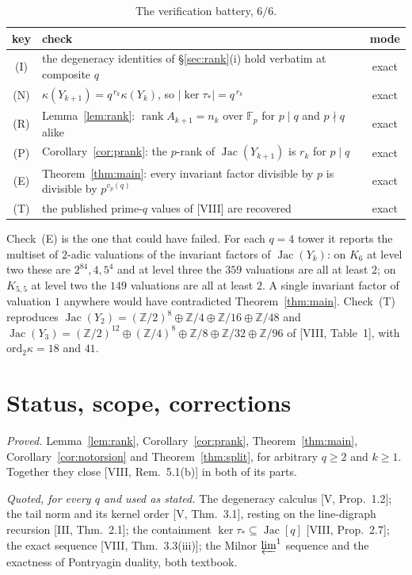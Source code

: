 \documentclass[11pt]{amsart}
\numberwithin{equation}{section}
\theoremstyle{definition}
\theoremstyle{remark}
\newcommand{\Z}{\mathbb{Z}}
\newcommand{\F}{\mathbb{F}}
\newcommand{\Jac}{\operatorname{Jac}}
\newcommand{\rank}{\operatorname{rank}}
\newcommand{\ta}{\tau_*}
\begin{document}
\begin{table}[ht]
\centering\small
\begin{tabular}{clc}
\toprule
key & check & mode\\
\midrule
(I) & the degeneracy identities of \S\ref{sec:rank}(i) hold verbatim at composite $q$ & exact\\
(N) & $\kappa(Y_{k+1})=q^{\,r_k}\kappa(Y_k)$, so $|\ker\ta|=q^{\,r_k}$ & exact\\
(R) & Lemma~\ref{lem:rank}: $\rank A_{k+1}=n_k$ over $\F_p$ for $p\mid q$ and $p\nmid q$ alike & exact\\
(P) & Corollary~\ref{cor:prank}: the $p$-rank of $\Jac(Y_{k+1})$ is $r_k$ for $p\mid q$ & exact\\
(E) & Theorem~\ref{thm:main}: every invariant factor divisible by $p$ is divisible by $p^{v_p(q)}$ & exact\\
(T) & the published prime-$q$ values of [VIII] are recovered & exact\\
\bottomrule
\end{tabular}
\caption{The verification battery, $6/6$.}
\label{tab:battery}
\end{table}

Check~(E) is the one that could have failed. For each $q=4$ tower it reports the
multiset of $2$-adic valuations of the invariant factors of $\Jac(Y_k)$: on $K_6$ at
level two these are $2^{84},4,5^4$ and at level three the $359$ valuations are all at
least $2$; on $K_{5,5}$ at level two the $149$ valuations are all at least $2$. A single
invariant factor of valuation $1$ anywhere would have contradicted
Theorem~\ref{thm:main}. Check~(T) reproduces
$\Jac(Y_2)=(\Z/2)^8\oplus\Z/4\oplus\Z/16\oplus\Z/48$ and
$\Jac(Y_3)=(\Z/2)^{12}\oplus(\Z/4)^8\oplus\Z/8\oplus\Z/32\oplus\Z/96$ of [VIII, Table~1],
with $\mathrm{ord}_2\kappa=18$ and $41$.

\section{Status, scope, corrections}\label{sec:scope}

\emph{Proved.} Lemma~\ref{lem:rank}, Corollary~\ref{cor:prank}, Theorem~\ref{thm:main},
Corollary~\ref{cor:notorsion} and Theorem~\ref{thm:split}, for arbitrary $q\ge2$ and
$k\ge1$. Together they close [VIII, Rem.~5.1(b)] in both of its parts.

\emph{Quoted, for every $q$ and used as stated.} The degeneracy calculus [V, Prop.~1.2];
the tail norm and its kernel order [V, Thm.~3.1], resting on the line-digraph recursion
[III, Thm.~2.1]; the containment $\ker\ta\subseteq\Jac[q]$ [VIII, Prop.~2.7]; the exact
sequence [VIII, Thm.~3.3(iii)]; the Milnor $\varprojlim^1$ sequence and the exactness of
Pontryagin duality, both textbook.
\end{document}
